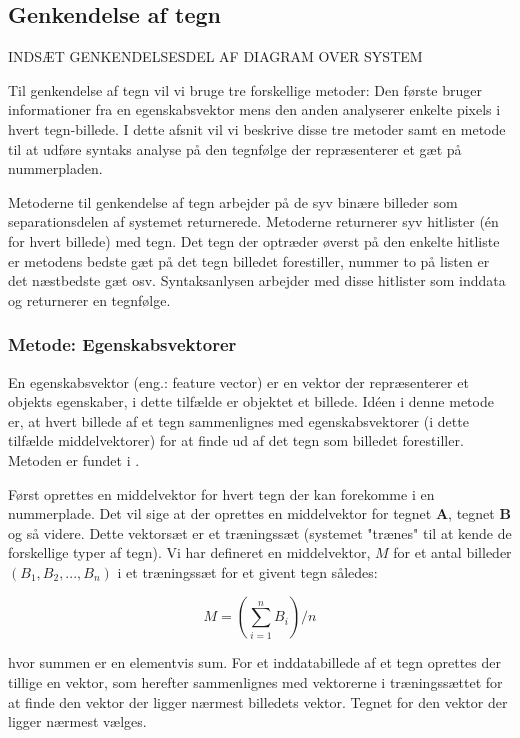 \subsection{Genkendelse af tegn}

INDSÆT GENKENDELSESDEL AF DIAGRAM OVER SYSTEM
\label{sec_monster}

Til genkendelse af tegn vil vi bruge tre forskellige metoder: Den første bruger informationer fra en egenskabsvektor mens den anden analyserer enkelte pixels i hvert tegn-billede. I dette afsnit vil vi beskrive disse tre metoder samt en metode til at udføre syntaks analyse på den tegnfølge der repræsenterer et gæt på nummerpladen.

Metoderne til genkendelse af tegn arbejder på de syv binære billeder som separationsdelen af systemet returnerede. Metoderne returnerer syv hitlister (én for hvert billede) med tegn. Det tegn der optræder øverst på den enkelte hitliste er metodens bedste gæt på det tegn billedet forestiller, nummer to på listen er det næstbedste gæt osv. Syntaksanlysen arbejder med disse hitlister som inddata og returnerer en tegnfølge.

\subsubsection{Metode: Egenskabsvektorer}
En egenskabsvektor (eng.: feature vector) er en vektor der repræsenterer et objekts egenskaber, i dette tilfælde er objektet et billede. Idéen i denne metode er, at hvert billede af et tegn sammenlignes med egenskabsvektorer (i dette tilfælde middelvektorer) for at finde ud af det tegn som billedet forestiller. Metoden er fundet i \cite{arth}.

Først oprettes en middelvektor for hvert tegn der kan forekomme i en nummerplade. Det vil sige at der oprettes en middelvektor for tegnet \textbf{A}, tegnet \textbf{B} og så videre. Dette vektorsæt er et træningssæt (systemet "trænes" til at kende de forskellige typer af tegn). Vi har defineret en middelvektor, $M$ for et antal billeder $(B_{1},B_{2},...,B_{n})$ i et træningssæt for et givent tegn således:

\begin{displaymath}
	M = (\sum_{i=1}^{n}B_i)/n
\end{displaymath}

hvor summen er en elementvis sum. For et inddatabillede af et tegn oprettes der tillige en vektor, som herefter sammenlignes med vektorerne i træningssættet for at finde den vektor der ligger nærmest billedets vektor. Tegnet for den vektor der ligger nærmest vælges.

